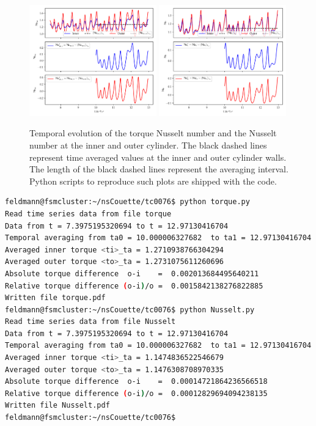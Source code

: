\documentclass[a4paper, 11pt, DIV=11]{scrartcl}
\begin{document}
\begin{figure}[htb]
\centering
\includegraphics[width=0.49\textwidth]{figures/tc0076/torque.pdf}
\includegraphics[width=0.49\textwidth]{figures/tc0076/Nusselt.pdf}
\caption{Temporal evolution of the torque Nusselt number and the Nusselt
number at the inner and outer cylinder. The black dashed lines represent
time averaged values at the inner and outer cylinder walls. The length of
the black dashed lines represent the averaging interval. Python scripts
to reproduce such plots are shipped with the code.}
\label{fig:tc0076torqueNusseltCompare}
\end{figure}
\begin{lstlisting}[language=bash]
feldmann@fsmcluster:~/nsCouette/tc0076$ python torque.py
Read time series data from file torque
Data from t = 7.3975195320694 to t = 12.97130416704
Temporal averaging from ta0 = 10.000006327682  to ta1 = 12.97130416704
Averaged inner torque <ti>_ta = 1.2710938766304294
Averaged outer torque <to>_ta = 1.2731075611260696
Absolute torque difference  o-i    =  0.002013684495640211
Relative torque difference (o-i)/o =  0.0015842138276822885
Written file torque.pdf
feldmann@fsmcluster:~/nsCouette/tc0076$ python Nusselt.py
Read time series data from file Nusselt
Data from t = 7.3975195320694 to t = 12.97130416704
Temporal averaging from ta0 = 10.000006327682  to ta1 = 12.97130416704
Averaged inner torque <ti>_ta = 1.1474836522546679
Averaged outer torque <to>_ta = 1.1476308708970335
Absolute torque difference  o-i    =  0.00014721864236566518
Relative torque difference (o-i)/o =  0.00012829694094238135
Written file Nusselt.pdf
feldmann@fsmcluster:~/nsCouette/tc0076$
\end{lstlisting}
\end{document}
